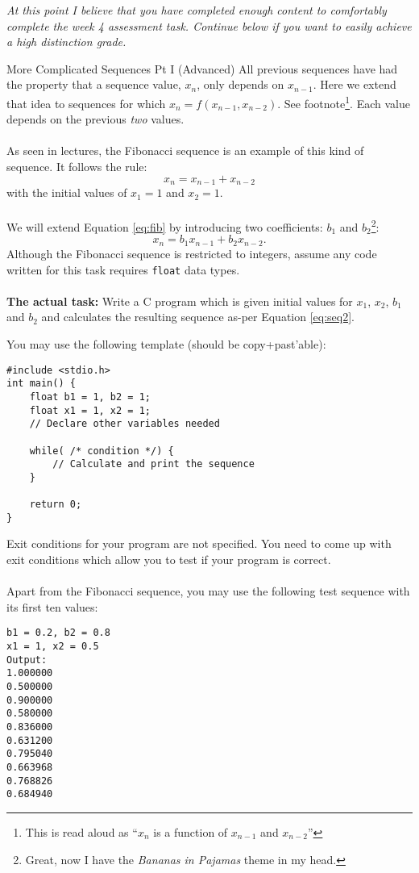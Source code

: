 \documentclass{lab}
\begin{document}
{\huge\textit{At this point I believe that you have completed enough content to comfortably complete the week 4 assessment task. Continue below if you want to easily achieve a high distinction grade.}}

\begin{task}{More Complicated Sequences Pt I (Advanced)}{}
All previous sequences have had the property that a sequence value, $x_n$, only depends on $x_{n-1}$. Here we extend that idea to sequences for which $x_n = f(x_{n-1}, x_{n-2})$. See footnote\footnote{This is read aloud as ``$x_n$ is a function of $x_{n-1}$ and $x_{n-2}$''}. Each value depends on the previous \textit{two} values.
\\ \\
As seen in lectures, the Fibonacci sequence is an example of this kind of sequence. It follows the rule:
\begin{equation}\label{eq:fib}
x_n = x_{n-1} + x_{n-2}
\end{equation}
with the initial values of $x_1 = 1$ and $x_2 = 1$.
\\ \\
We will extend Equation \eqref{eq:fib} by introducing two coefficients: $b_1$ and $b_2$\footnote{Great, now I have the \textit{Bananas in Pajamas} theme in my head.}:
\begin{equation}\label{eq:seq2}
x_n = b_1x_{n-1} + b_2x_{n-2}.
\end{equation}
Although the Fibonacci sequence is restricted to integers, assume any code written for this task requires \texttt{float} data types.
\\ \\
\textbf{The actual task:} Write a C program which is given initial values for $x_1$, $x_2$, $b_1$ and $b_2$ and calculates the resulting sequence as-per Equation \eqref{eq:seq2}.

You may use the following template (should be copy+past'able):
\begin{lstlisting}[style=pseudo]
#include <stdio.h>
int main() {
	float b1 = 1, b2 = 1;
	float x1 = 1, x2 = 1;
	// Declare other variables needed
		
	while( /* condition */) {
		// Calculate and print the sequence
	}	
	
	return 0;
}
\end{lstlisting}
Exit conditions for your program are not specified. You need to come up with exit conditions which allow you to test if your program is correct.
\\ \\
Apart from the Fibonacci sequence, you may use the following test sequence with its first ten values:
\begin{lstlisting}[style=pseudo]
b1 = 0.2, b2 = 0.8
x1 = 1, x2 = 0.5
Output:
1.000000
0.500000
0.900000
0.580000
0.836000
0.631200
0.795040
0.663968
0.768826
0.684940
\end{lstlisting}
\end{task}
\end{document}
